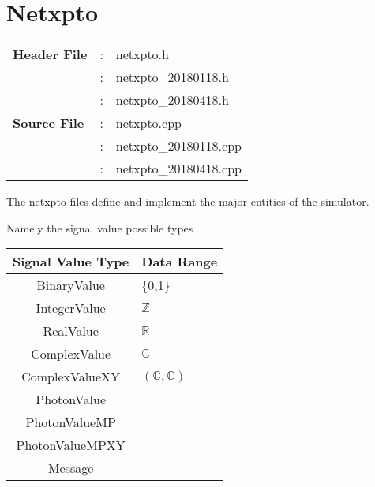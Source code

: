\clearpage

\section{Netxpto}

\begin{tcolorbox}	
	\begin{tabular}{p{2.75cm} p{0.2cm} p{10.5cm}} 	
		\textbf{Header File}   &:& netxpto.h\\
                               &:& netxpto\_20180118.h\\
                               &:& netxpto\_20180418.h\\
		\textbf{Source File}   &:& netxpto.cpp \\
                               &:& netxpto\_20180118.cpp \\
                               &:& netxpto\_20180418.cpp \\
	\end{tabular}
\end{tcolorbox}

The netxpto files define and implement the major entities of the simulator.

Namely the signal value possible types
\begin{center}
\begin{tabular}{|c|l|}
    \hline
    Signal Value Type & Data Range\\
    \hline
    BinaryValue         & \{0,1\} \\
    IntegerValue        & $\mathbb{Z}$ \\
    RealValue           & $\mathbb{R}$ \\
    ComplexValue        & $\mathbb{C}$ \\
    ComplexValueXY      & $(\mathbb{C}, \mathbb{C})$ \\
    PhotonValue         & \\
    PhotonValueMP       & \\
    PhotonValueMPXY     & \\
    Message             & \\
    \hline
\end{tabular}
\end{center}


